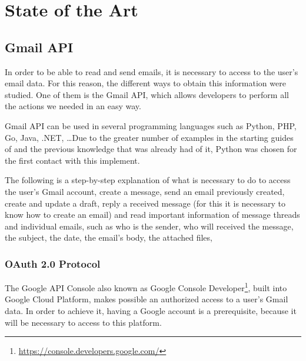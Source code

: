 \chapter{State of the Art}
\label{cap:estadoDeLaCuestion}

\section{Gmail API}
In order to be able to read and send emails, it is necessary to access to the user's email data. For this reason, the different ways to obtain this information were studied. One of them is the Gmail API, which allows developers to perform all the actions we needed in an easy way.

Gmail API can be used in several programming languages such as Python, PHP, Go, Java, .NET, \ldots Due to the greater number of examples in the starting guides of \cite{gmailAPI} and the previous knowledge that was already had of it, Python was chosen for the first contact with this implement.

The following is a step-by-step explanation of what is necessary to do to access the user's Gmail account, create a message, send an email previously created, create and update a draft, reply a received message (for this it is necessary to know how to create an email) and read important information of message threads and individual emails, such as who is the sender, who will received the message, the subject, the date, the email's body, the attached files, \ldtos

\subsection{OAuth 2.0 Protocol}

The Google API Console also known as Google Console Developer\footnote{\url{https://console.developers.google.com/}}, built into Google Cloud Platform, makes possible an authorized access to a user's Gmail data. In order to achieve it, having a Google account is a prerequisite, because it will be necessary to access to this platform.
